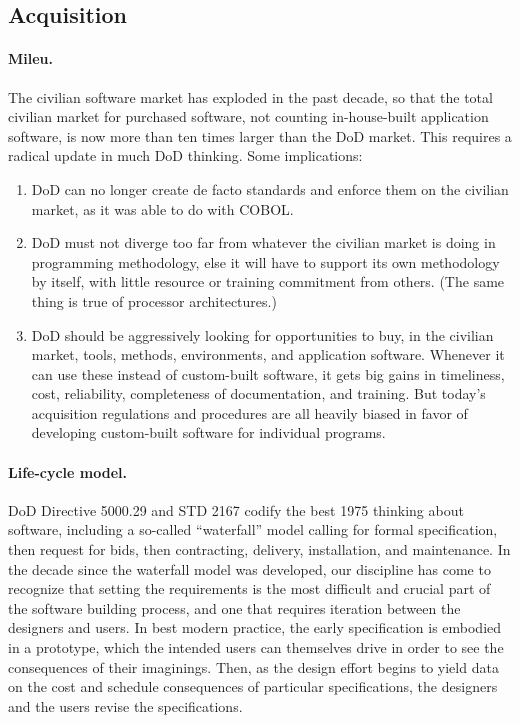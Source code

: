 \documentclass[12pt,final]{article}
\begin{document}
\subsection*{Acquisition}

\paragraph{Mileu.} The civilian software market has exploded in the past decade, so that the total
civilian market for purchased software, not counting in-house-built application software, is
now more than ten times larger than the DoD market. This requires a radical update in
much DoD thinking. Some implications:

\begin{enumerate}
\item DoD can no longer create de facto standards and enforce them on the civilian market,
as it was able to do with COBOL.

\item DoD must not diverge too far from whatever the civilian market is doing in programming methodology, else it will have to support its own methodology by itself, with little
resource or training commitment from others. (The same thing is true of processor
architectures.)

\item DoD should be aggressively looking for opportunities to buy, in the civilian market,
tools, methods, environments, and application software. Whenever it can use these
instead of custom-built software, it gets big gains in timeliness, cost, reliability,
completeness of documentation, and training. But today’s acquisition regulations
and procedures are all heavily biased in favor of developing custom-built software
for individual programs.
\end{enumerate}

\paragraph{Life-cycle model.} DoD Directive 5000.29 and STD 2167 codify the
best 1975 thinking about software, including a so-called “waterfall” model
calling for formal specification, then request for bids, then contracting,
delivery, installation, and maintenance. In the decade since the waterfall
model was developed, our discipline has come to recognize that setting the
requirements is the most difficult and crucial part of the software building
process, and one that requires iteration between the designers and users. In
best modern practice, the early specification is embodied in a prototype, which
the intended users can themselves drive in order to see the consequences of
their imaginings. Then, as the design effort begins to yield data on the cost
and schedule consequences of particular specifications, the designers and the
users revise the specifications.
\end{document}
